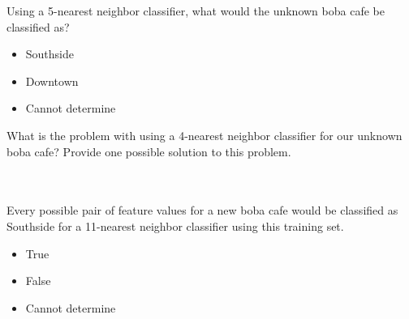 \begin{enumerate}

 Using a 5-nearest neighbor classifier, what would the unknown boba cafe be classified as?
\begin{itemize}[label=\bubble]
\item Southside
\item Downtown
\item Cannot determine
\end{itemize} 


 What is the problem with using a 4-nearest neighbor classifier for our unknown boba cafe? Provide one possible solution to this problem. \\ \\ \\
\vfill 



 Every possible pair of feature values for a new boba cafe would be classified as Southside for a 11-nearest neighbor classifier using this training set.
\begin{itemize}[label=\bubble]
\item True
\item False
\item Cannot determine
\end{itemize} 


\vfill
\end{enumerate}

